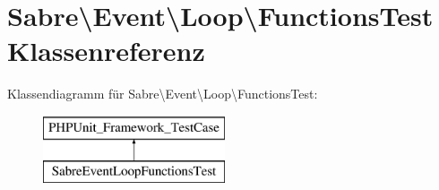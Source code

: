 \hypertarget{class_sabre_1_1_event_1_1_loop_1_1_functions_test}{}\section{Sabre\textbackslash{}Event\textbackslash{}Loop\textbackslash{}Functions\+Test Klassenreferenz}
\label{class_sabre_1_1_event_1_1_loop_1_1_functions_test}
Klassendiagramm für Sabre\textbackslash{}Event\textbackslash{}Loop\textbackslash{}Functions\+Test\+:\begin{figure}[H]
\begin{center}
\leavevmode
\includegraphics[height=2.000000cm]{class_sabre_1_1_event_1_1_loop_1_1_functions_test}
\end{center}
\end{figure}
